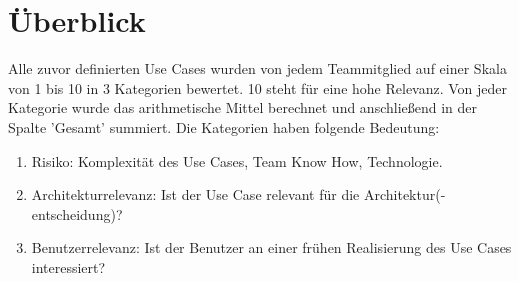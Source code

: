 \documentclass[a4paper,12pt,twoside]{scrreprt}
\begin{document}
    \section{Überblick}
        Alle zuvor definierten Use Cases wurden von jedem Teammitglied auf einer Skala von 1 bis 10 in 3 Kategorien
        bewertet. 10 steht für eine hohe Relevanz. Von jeder Kategorie wurde das arithmetische Mittel berechnet
        und anschließend in der Spalte 'Gesamt' summiert.
        Die Kategorien haben folgende Bedeutung:
        \begin{enumerate}
            \item Risiko: Komplexität des Use Cases, Team Know How, Technologie.
            \item Architekturrelevanz: Ist der Use Case relevant für die Architektur(-entscheidung)?
            \item Benutzerrelevanz: Ist der Benutzer an einer frühen Realisierung des Use Cases interessiert?
        \end{enumerate}
\end{document}
